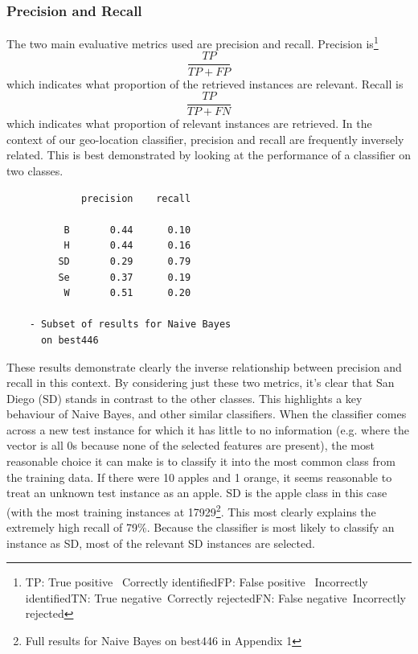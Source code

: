 \documentclass[twocolumn]{article}
\begin{document}
\subsubsection{Precision and Recall}
The two main evaluative metrics used are precision and recall. Precision is\footnote{\newline TP: True positive \,\,\,Correctly identified\newline FP: False positive \,\,\,Incorrectly identified\newline TN: True negative \,\hspace{0.1em}Correctly rejected\newline FN: False negative\, Incorrectly rejected} 
\begin{equation}
\frac{TP}{TP+FP}
\end{equation}
which indicates what proportion of the retrieved instances are relevant. Recall is
\begin{equation}
\frac{TP}{TP+FN}
\end{equation}
which indicates what proportion of relevant instances are retrieved.
\clearpage
In the context of our geo-location classifier, precision and recall are frequently inversely related. This is best demonstrated by looking at the performance of a classifier on two classes.
\begin{verbatim}
             precision    recall

          B       0.44      0.10
          H       0.44      0.16
         SD       0.29      0.79
         Se       0.37      0.19
          W       0.51      0.20
          
    - Subset of results for Naive Bayes 
      on best446
\end{verbatim}

These results demonstrate clearly the inverse relationship between precision and recall in this context. By considering just these two metrics, it's clear that San Diego (SD) stands in contrast to the other classes. This highlights a key behaviour of Naive Bayes, and other similar classifiers. When the classifier comes across a new test instance for which it has little to no information (e.g. where the vector is all 0s because none of the selected features are present), the most reasonable choice it can make is to classify it into the most common class from the training data. If there were 10 apples and 1 orange, it seems reasonable to treat an unknown test instance as an apple. SD is the apple class in this case (with the most training instances at 17929\footnote{Full results for Naive Bayes on best446 in Appendix 1}. This most clearly explains the extremely high recall of 79\%. Because the classifier is most likely to classify an instance as SD, most of the relevant SD instances are selected. 
\end{document}
